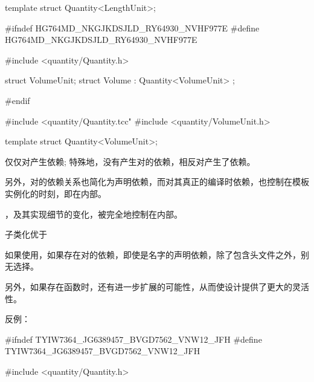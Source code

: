 \begin{content}
\begin{leftbar}
\begin{c++}[caption={\ttfamily{quantity/Length.cpp}}]
template struct Quantity<LengthUnit>;
\end{c++}
\end{leftbar}

\begin{leftbar}
\begin{c++}[caption={\ttfamily{quantity/Volume.h}}]
#ifndef HG764MD_NKGJKDSJLD_RY64930_NVHF977E
#define HG764MD_NKGJKDSJLD_RY64930_NVHF977E

#include <quantity/Quantity.h>

struct VolumeUnit;
struct Volume : Quantity<VolumeUnit> {};

#endif
\end{c++}
\end{leftbar}

\begin{leftbar}
\begin{c++}[caption={\ttfamily{quantity/Volume.cpp}}]
#include <quantity/Quantity.tcc"
#include <quantity/VolumeUnit.h>

template struct Quantity<VolumeUnit>;
\end{c++}
\end{leftbar}

仅仅对产生依赖; 特殊地，没有产生对的依赖，相反对产生了依赖。

另外，对的依赖关系也简化为声明依赖，而对其真正的编译时依赖，也控制在模板实例化的时刻，即在内部。

，及其实现细节的变化，被完全地控制在内部。

\begin{advise}
子类化优于
\end{advise}

如果使用，如果存在对的依赖，即使是名字的声明依赖，除了包含头文件之外，别无选择。

另外，如果存在函数时，还有进一步扩展的可能性，从而使设计提供了更大的灵活性。

反例：
\begin{leftbar}
\begin{c++}[caption={\ttfamily{quantity/Length.h}}]
#ifndef TYIW7364_JG6389457_BVGD7562_VNW12_JFH
#define TYIW7364_JG6389457_BVGD7562_VNW12_JFH

#include <quantity/Quantity.h>


\end{c++}
\end{leftbar}
\end{content}
